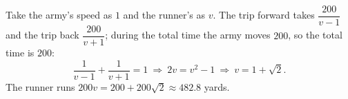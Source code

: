 Take the army's speed as $1$ and the runner's as $v$. The trip forward takes $\dfrac{200}{v-1}$ and the trip back $\dfrac{200}{v+1}$; during the total time the army moves $200$, so the total time is $200$:
\[\dfrac{1}{v-1}+\dfrac{1}{v+1}=1\ \Longrightarrow\ 2v=v^2-1\ \Longrightarrow\ v=1+\sqrt2.\]
The runner runs $200v=\boxed{200+200\sqrt2}\approx482.8$ yards.

